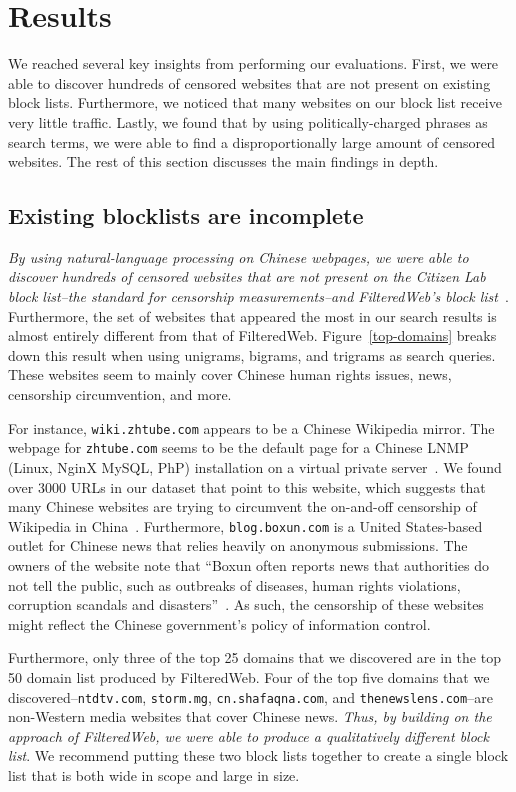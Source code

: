 \section{Results}
We reached several key insights from performing our
evaluations. First, we were able to discover hundreds of
censored websites that are not present on existing block
lists. Furthermore, we noticed that many websites on our block list
receive very little traffic. Lastly, we found that by using
politically-charged phrases as search terms, we were able to find a
disproportionally large amount of censored websites. The rest of this
section discusses the main findings in depth.

\subsection{Existing blocklists are incomplete}
\textit{By using natural-language processing on Chinese webpages, we
were able to discover hundreds of censored websites that are not
present on the Citizen Lab block list--the standard for censorship
measurements--and FilteredWeb's block list~\cite{darer2017filteredweb,
citizenlab:block}}. Furthermore, the set of websites that appeared the
most in our search results is almost entirely different from that of
FilteredWeb. Figure~\ref{top-domains} breaks down this result when
using unigrams, bigrams, and trigrams as search queries. These websites seem
to mainly cover Chinese human rights issues, news, censorship
circumvention, and more.

For instance, \texttt{wiki.zhtube.com} appears to be a Chinese
Wikipedia mirror. The webpage for \texttt{zhtube.com} seems to be the
default page for a Chinese LNMP (Linux, NginX MySQL, PhP) installation
on a virtual private server~\cite{lnmp}. We found over 3000 URLs in
our dataset that point to this website, which suggests that many
Chinese websites are trying to circumvent the on-and-off censorship of
Wikipedia in China~\cite{wikipedia-china}. Furthermore,
\texttt{blog.boxun.com} is a United States-based outlet for Chinese
news that relies heavily on anonymous submissions. The owners of the
website note that ``Boxun often reports news that authorities do not
tell the public, such as outbreaks of diseases, human rights
violations, corruption scandals and disasters''~\cite{boxun-about}. As
such, the censorship of these websites might reflect the Chinese
government's policy of information control.

Furthermore, only three of the top 25 domains that we discovered are in
the top 50 domain list produced by FilteredWeb. Four of the top five
domains that we discovered--\texttt{ntdtv.com},
\texttt{storm.mg}, \texttt{cn.shafaqna.com}, and
\texttt{thenewslens.com}--are non-Western media websites that cover
Chinese news. \textit{Thus, by building on the
approach of FilteredWeb, we were able to produce a qualitatively
different block list}. We recommend putting these two block lists
together to create a single block list that is both wide in scope and
large in size.

